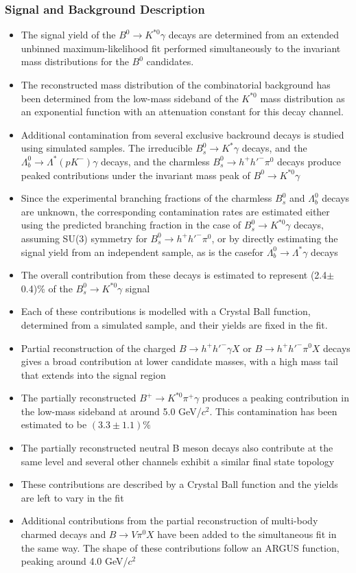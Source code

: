 \documentclass{article}
\begin{document}
\subsubsection{Signal and Background Description}
\begin{itemize}
\item The signal yield of the $B^{0}\rightarrow K^{*0}\gamma$ decays are determined from an extended unbinned maximum-likelihood fit performed simultaneously to the invariant mass distributions for the $B^{0}$ candidates.
\item The reconstructed mass distribution of the combinatorial background has been determined from the low-mass sideband of the $K^{*0}$ mass distribution as an exponential function with an attenuation constant for this decay channel. 
\item Additional contamination from several exclusive backround decays is studied using simulated samples. The irreducible $B^{0}_{s}\rightarrow K^{*}\gamma$ decays, and the $\Lambda^{0}_{b}\rightarrow\Lambda^{*}(pK^{-})\gamma$ decays, and the charmless $B^{0}_{s}\rightarrow h^{+} h'^{-}\pi^{0}$ decays produce peaked contributions under the invariant mass peak of $B^{0}\rightarrow K^{*0}\gamma$
\item Since the experimental branching fractions of the charmless $B^{0}_{s}$ and $\Lambda^{0}_{b}$ decays are unknown, the corresponding contamination rates are estimated either using the predicted branching fraction in the case of $B^{0}_{s}\rightarrow K^{*0}\gamma$ decays, assuming SU(3) symmetry for $B^{0}_{s}\rightarrow h^{+}h'^{-}\pi^{0}$, or by directly estimating the signal yield from an independent sample, as is the casefor $\Lambda^{0}_{b}\rightarrow\Lambda^{*}\gamma$ decays
\item The overall contribution from these decays is estimated to represent (2.4$\pm$ 0.4)\% of the $B^{0}_{s}\rightarrow K^{*0}\gamma$ signal
\item Each of these contributions is modelled with a Crystal Ball function, determined from a simulated sample, and their yields are fixed in the fit.
\item Partial reconstruction of the charged $B\rightarrow h^{+}h'^{-}\gamma X$ or $B\rightarrow h^{+}h'^{-}\pi^{0}X$ decays gives a broad contribution at lower candidate masses, with a high mass tail that extends into the signal region
\item The partially reconstructed $B^{+}\rightarrow K^{*0}\pi^{+}\gamma$ produces a peaking contribution in the low-mass sideband at around 5.0 GeV/$c^{2}$. This contamination has been estimated to be $(3.3\pm 1.1)\%$
\item The partially reconstructed neutral B meson decays also contribute at the same level and several other channels exhibit a similar final state topology
\item These contributions are described by a Crystal Ball function and the yields are left to vary in the fit
\item Additional contributions from the partial reconstruction of multi-body charmed decays and $B\rightarrow V\pi^{0}X$ have been added to the simultaneous fit in the same way. The shape of these contributions follow an ARGUS function, peaking around 4.0 GeV/$c^{2}$
\end{itemize}
\end{document}
